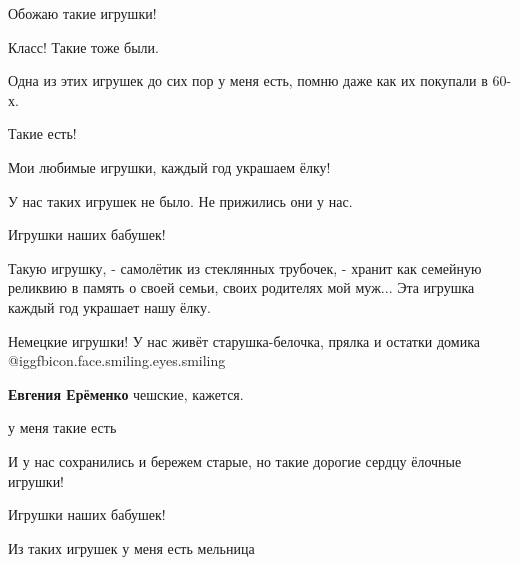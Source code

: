  
 
 
 
 

Обожаю такие игрушки!


Класс! Такие тоже были.

Одна из этих игрушек до сих пор у меня есть, помню даже как их покупали в 60-х.

Такие есть!

Мои любимые игрушки, каждый год украшаем ёлку!

У нас таких игрушек не было. Не прижились они у нас.

Игрушки наших бабушек!


Такую игрушку, - самолётик из стеклянных трубочек, - хранит как семейную
реликвию в память о своей семьи, своих родителях мой муж...  Эта игрушка каждый
год украшает нашу ёлку.


Немецкие игрушки! У нас живёт старушка-белочка, прялка и остатки домика
@igg{fbicon.face.smiling.eyes.smiling} 

\textbf{Евгения Ерёменко} чешские, кажется.

у меня такие есть

И у нас сохранились и бережем старые, но такие дорогие сердцу ёлочные игрушки!

Игрушки наших бабушек!

Из таких игрушек у меня есть мельница
